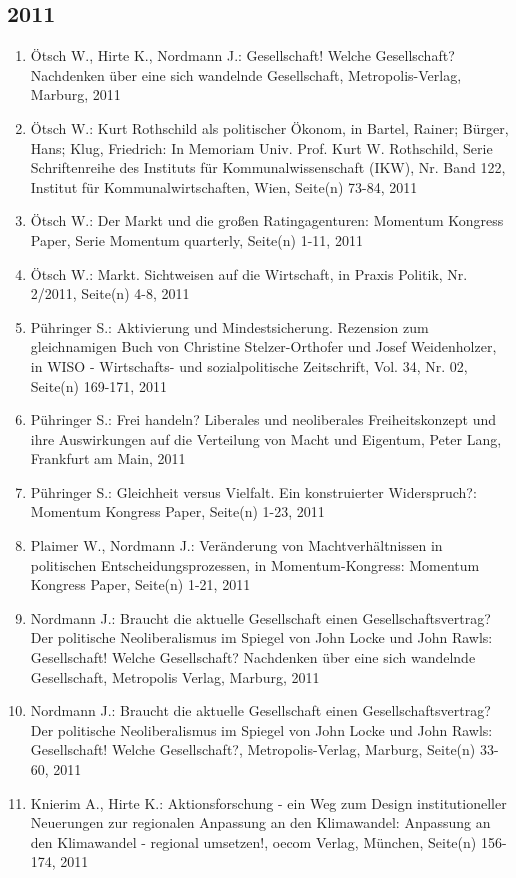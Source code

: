 \subsection*{2011}
\begin{enumerate}
    	 \item Ötsch W., Hirte K., Nordmann J.: Gesellschaft! Welche Gesellschaft? Nachdenken über eine sich wandelnde Gesellschaft, Metropolis-Verlag, Marburg, 2011
	 \item Ötsch W.: Kurt Rothschild als politischer Ökonom, in Bartel, Rainer; Bürger, Hans; Klug, Friedrich: In Memoriam Univ. Prof. Kurt W. Rothschild, Serie Schriftenreihe des Instituts für Kommunalwissenschaft (IKW), Nr. Band 122, Institut für Kommunalwirtschaften, Wien, Seite(n) 73-84, 2011
	 \item Ötsch W.: Der Markt und die großen Ratingagenturen: Momentum Kongress Paper, Serie Momentum quarterly, Seite(n) 1-11, 2011
	 \item Ötsch W.: Markt. Sichtweisen auf die Wirtschaft, in Praxis Politik, Nr. 2/2011, Seite(n) 4-8, 2011
	 \item Pühringer S.: Aktivierung und Mindestsicherung. Rezension zum gleichnamigen Buch von Christine Stelzer-Orthofer und Josef Weidenholzer, in WISO - Wirtschafts- und sozialpolitische Zeitschrift, Vol. 34, Nr. 02, Seite(n) 169-171, 2011
	 \item Pühringer S.: Frei handeln? Liberales und neoliberales Freiheitskonzept und ihre Auswirkungen auf die Verteilung von Macht und Eigentum, Peter Lang, Frankfurt am Main, 2011
	 \item Pühringer S.: Gleichheit versus Vielfalt. Ein konstruierter Widerspruch?: Momentum Kongress Paper, Seite(n) 1-23, 2011
	 \item Plaimer W., Nordmann J.: Veränderung von Machtverhältnissen in politischen Entscheidungsprozessen, in Momentum-Kongress: Momentum Kongress Paper, Seite(n) 1-21, 2011
	 \item Nordmann J.: Braucht die aktuelle Gesellschaft einen Gesellschaftsvertrag? Der politische Neoliberalismus im Spiegel von John Locke und John Rawls: Gesellschaft! Welche Gesellschaft? Nachdenken über eine sich wandelnde Gesellschaft, Metropolis Verlag, Marburg, 2011
	 \item Nordmann J.: Braucht die aktuelle Gesellschaft einen Gesellschaftsvertrag? Der politische Neoliberalismus im Spiegel von John Locke und John Rawls: Gesellschaft! Welche Gesellschaft?, Metropolis-Verlag, Marburg, Seite(n) 33-60, 2011
	 \item Knierim A., Hirte K.: Aktionsforschung - ein Weg zum Design institutioneller Neuerungen zur regionalen Anpassung an den Klimawandel: Anpassung an den Klimawandel - regional umsetzen!, oecom Verlag, München, Seite(n) 156-174, 2011

\end{enumerate}
